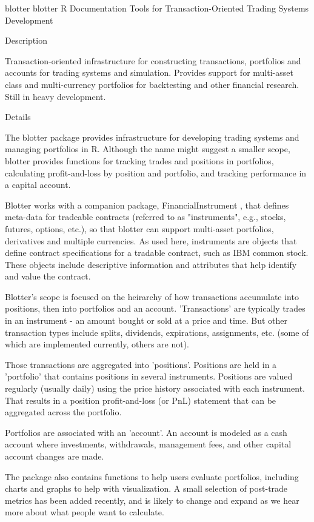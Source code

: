 
blotter {blotter}	R Documentation
Tools for Transaction-Oriented Trading Systems Development

Description

Transaction-oriented infrastructure for constructing transactions, portfolios and accounts for trading systems and simulation. Provides support for multi-asset class and multi-currency portfolios for backtesting and other financial research. Still in heavy development.

Details

The blotter package provides infrastructure for developing trading systems and managing portfolios in R. Although the name might suggest a smaller scope, blotter provides functions for tracking trades and positions in portfolios, calculating profit-and-loss by position and portfolio, and tracking performance in a capital account.

Blotter works with a companion package, FinancialInstrument , that defines meta-data for tradeable contracts (referred to as "instruments", e.g., stocks, futures, options, etc.), so that blotter can support multi-asset portfolios, derivatives and multiple currencies. As used here, instruments are objects that define contract specifications for a tradable contract, such as IBM common stock. These objects include descriptive information and attributes that help identify and value the contract.

Blotter's scope is focused on the heirarchy of how transactions accumulate into positions, then into portfolios and an account. 'Transactions' are typically trades in an instrument - an amount bought or sold at a price and time. But other transaction types include splits, dividends, expirations, assignments, etc. (some of which are implemented currently, others are not).

Those transactions are aggregated into 'positions'. Positions are held in a 'portfolio' that contains positions in several instruments. Positions are valued regularly (usually daily) using the price history associated with each instrument. That results in a position profit-and-loss (or PnL) statement that can be aggregated across the portfolio.

Portfolios are associated with an 'account'. An account is modeled as a cash account where investments, withdrawals, management fees, and other capital account changes are made.

The package also contains functions to help users evaluate portfolios, including charts and graphs to help with visualization. A small selection of post-trade metrics has been added recently, and is likely to change and expand as we hear more about what people want to calculate.

